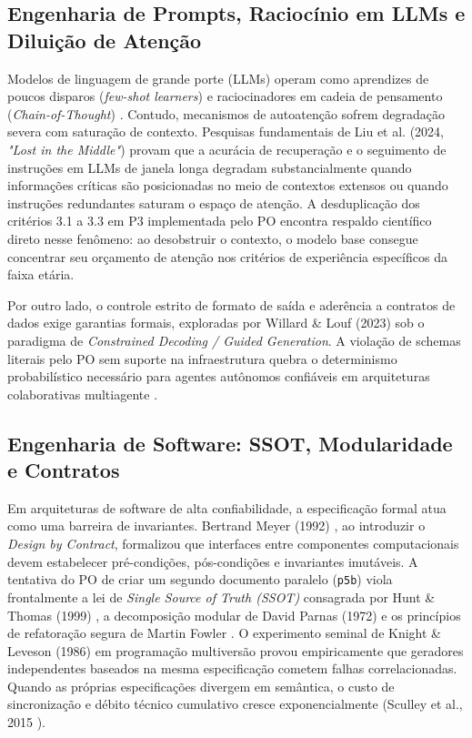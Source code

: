 \documentclass[11pt,a4paper]{article}
\begin{document}
\subsection{Engenharia de Prompts, Raciocínio em LLMs e Diluição de Atenção}
Modelos de linguagem de grande porte (LLMs) operam como aprendizes de poucos disparos (\textit{few-shot learners}) \cite{brown2020language} e raciocinadores em cadeia de pensamento (\textit{Chain-of-Thought}) \cite{wei2022chain,kojima2022large}.
Contudo, mecanismos de autoatenção sofrem degradação severa com saturação de contexto.
Pesquisas fundamentais de Liu et al. (2024, \textit{"Lost in the Middle"}) \cite{liu2024lost} provam que a acurácia de recuperação e o seguimento de instruções em LLMs de janela longa degradam substancialmente quando informações críticas são posicionadas no meio de contextos extensos ou quando instruções redundantes saturam o espaço de atenção.
A desduplicação dos critérios 3.1 a 3.3 em P3 implementada pelo PO encontra respaldo científico direto nesse fenômeno: ao desobstruir o contexto, o modelo base consegue concentrar seu orçamento de atenção nos critérios de experiência específicos da faixa etária.

Por outro lado, o controle estrito de formato de saída e aderência a contratos de dados exige garantias formais, exploradas por Willard \& Louf (2023) \cite{willard2023efficient} sob o paradigma de \textit{Constrained Decoding / Guided Generation}. A violação de schemas literais pelo PO sem suporte na infraestrutura quebra o determinismo probabilístico necessário para agentes autônomos confiáveis em arquiteturas colaborativas multiagente \cite{wu2023autogen,hong2024metagpt,park2023generative}.

\subsection{Engenharia de Software: SSOT, Modularidade e Contratos}
Em arquiteturas de software de alta confiabilidade, a especificação formal atua como uma barreira de invariantes. Bertrand Meyer (1992) \cite{meyer1992applying}, ao introduzir o \textit{Design by Contract}, formalizou que interfaces entre componentes computacionais devem estabelecer pré-condições, pós-condições e invariantes imutáveis.
A tentativa do PO de criar um segundo documento paralelo (\texttt{p5b}) viola frontalmente a lei de \textit{Single Source of Truth (SSOT)} consagrada por Hunt \& Thomas (1999) \cite{hunt1999pragmatic}, a decomposição modular de David Parnas (1972) \cite{parnas1972criteria} e os princípios de refatoração segura de Martin Fowler \cite{fowler1999refactoring}.
O experimento seminal de Knight \& Leveson (1986) \cite{knight1986experimental} em programação multiversão provou empiricamente que geradores independentes baseados na mesma especificação cometem falhas correlacionadas. Quando as próprias especificações divergem em semântica, o custo de sincronização e débito técnico cumulativo cresce exponencialmente (Sculley et al., 2015 \cite{sculley2015hidden}).
\end{document}
